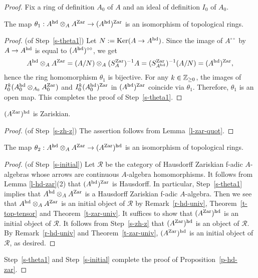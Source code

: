 \begin{proof}
Fix a ring of definition $A_0$ of $A$ and 
an ideal of definition $I_0$ of $A_0$. 

\setcounter{step}{0}

\begin{step}\label{s-theta1}
The map 
$\theta_1:A^{{\operatorname{hd}}} \otimes_A A^{{\operatorname{Zar}}} \to (A^{{\operatorname{hd}}})^{{\operatorname{Zar}}}$ is an isomorphism 
of topological rings. 
\end{step}

\begin{proof}(of Step~\ref{s-theta1}) 
Let $N:={\operatorname{Ker}}(A \to A^{{\operatorname{hd}}})$. 
Since the image of $A^{\circ\circ}$ by $A \to A^{{\operatorname{hd}}}$ is equal to $(A^{{\operatorname{hd}}})^{\circ\circ}$, we get 
$$A^{{\operatorname{hd}}} \otimes_A A^{{\operatorname{Zar}}} =(A/N) \otimes_A (S_A^{{\operatorname{Zar}}})^{-1}A
= (S^{{\operatorname{Zar}}}_{A^{{\operatorname{hd}}}})^{-1}(A/N)=(A^{{\operatorname{hd}}})^{{\operatorname{Zar}}},$$
hence the ring homomorphism $\theta_1$ is bijective. 
For any $k \in \mathbb{Z}_{\geq 0}$, the images of 
$I_0^k(A_0^{{\operatorname{hd}}} \otimes_{A_0} A_0^{{\operatorname{Zar}}})$ and $I_0^k(A_0^{{\operatorname{hd}}})^{{\operatorname{Zar}}}$ 
in $(A^{{\operatorname{hd}}})^{{\operatorname{Zar}}}$ coincide via $\theta_1$. 
Therefore, $\theta_1$ is an open map. 
This completes the proof of Step~\ref{s-theta1}. 
\end{proof}








\begin{step}\label{s-zh-z}
$(A^{{\operatorname{Zar}}})^{{\operatorname{hd}}}$ is Zariskian. 
\end{step}

\begin{proof}(of Step~\ref{s-zh-z}) 
The assertion follows from Lemma~\ref{l-zar-quot}. 
\end{proof}



\begin{step}\label{s-initial}
The map $\theta_2:A^{{\operatorname{hd}}} \otimes_A A^{{\operatorname{Zar}}} \to (A^{{\operatorname{Zar}}})^{{\operatorname{hd}}}$ is an isomorphism of topological rings. 
\end{step}

\begin{proof}(of Step~\ref{s-initial}) 
Let $\mathcal R$ be the category of 
Hausdorff Zariskian f-adic $A$-algebras 
whose arrows are continuous $A$-algebra homomorphisms. 
It follows from Lemma \ref{l-hd-zar}(2) that $(A^{{\operatorname{hd}}})^{{\operatorname{Zar}}}$ is Hausdorff. 
In particular, Step~\ref{s-theta1} implies that 
$A^{{\operatorname{hd}}} \otimes_A A^{{\operatorname{Zar}}}$ is a Hausdorff Zariskian f-adic $A$-algebra. 
Then we see that $A^{{\operatorname{hd}}} \otimes_A A^{{\operatorname{Zar}}}$ is 
an initial object of $\mathcal R$ 
by Remark~\ref{r-hd-univ}, Theorem~\ref{t-top-tensor} 
and Theorem~\ref{t-zar-univ}. 
It suffices to show that $(A^{{\operatorname{Zar}}})^{{\operatorname{hd}}}$ is an initial object of $\mathcal R$. 
It follows from Step~\ref{s-zh-z} that 
$(A^{{\operatorname{Zar}}})^{{\operatorname{hd}}}$ is an object of $\mathcal R$. 
By Remark~\ref{r-hd-univ} and Theorem~\ref{t-zar-univ}, 
$(A^{{\operatorname{Zar}}})^{{\operatorname{hd}}}$ is an initial object of $\mathcal R$, as desired. 
\end{proof}
Step~\ref{s-theta1} and Step~\ref{s-initial} complete 
the proof of Proposition~\ref{p-hd-zar}. 
\end{proof}




